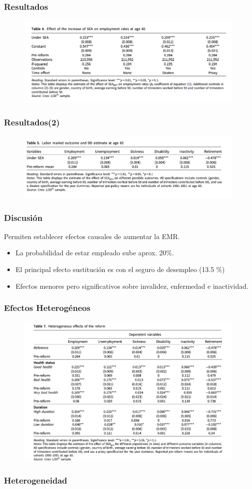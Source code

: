 \documentclass{beamer}
\begin{document}
  \frame
  {
    \frametitle{Resultados}
      \begin{figure}[htp]
        \centering
        \includegraphics[width=12cm]{imgs/rabate-tab4}
        \label{fig:fig2}
      \end{figure}
  }
  \frame
  {
    \frametitle{Resultados(2)}
      \begin{figure}[htp]
        \centering
        \includegraphics[width=12cm]{imgs/rabate-tab5}
        \label{fig:fig2}
      \end{figure}
  }
  \frame
  {
    \frametitle{Discusión}
      Permiten establecer efectos causales de aumentar la EMR.
      \begin{itemize}
      \item La probabilidad de estar empleado sube aprox. 20\%.
      \item El principal efecto sustitución es con el seguro de desempleo (13.5 \%)
      \item Efectos menores pero significativos sobre invalidez, enfermedad e inactividad.
      \end{itemize}
  }
  \frame
  {
    \frametitle{Efectos Heterogéneos}
        \begin{figure}[htp]
        \centering
        \includegraphics[width=12cm]{imgs/rabate-tab7}
        \label{fig:fig2}
      \end{figure}
  }
  \frame
  {
    \frametitle{Heterogeneidad}
  }
  
\end{document}
